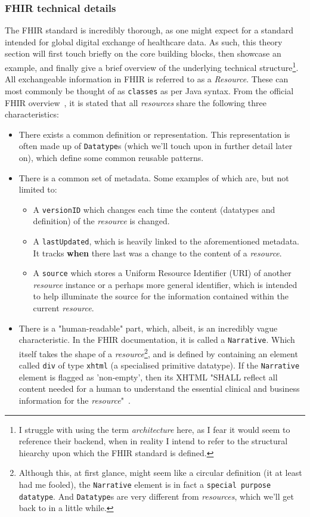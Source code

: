 \subsubsection*{FHIR technical details}
The FHIR standard is incredibly thorough, as one might expect for a standard intended for global digital exchange of healthcare data. As such, this theory section will first touch briefly on the core building blocks, then showcase an example, and finally give a brief overview of the underlying technical structure\footnote{I struggle with using the term \emph{architecture} here, as I fear it would seem to reference their backend, when in reality I intend to refer to the structural hiearchy upon which the FHIR standard is defined.}.
\\ 
All exchangeable information in FHIR is referred to as a \emph{Resource}. These can most commonly be thought of as \texttt{classes} as per Java syntax. From the official FHIR overview~\cite{FHIR-overview}, it is stated that all \emph{resources} share the following three characteristics:
\begin{itemize}
	\item There exists a common definition or representation. This representation is often made up of \texttt{Datatype}s (which we'll touch upon in further detail later on), which define some common reusable patterns.
	\item There is a common set of metadata. Some examples of which are, but not limited to:
	\begin{itemize}
		\item A \texttt{versionID} which changes each time the content (datatypes and definition) of the \emph{resource} is changed.
		\item  A \texttt{lastUpdated}, which is heavily linked to the aforementioned metadata. It tracks \textbf{when} there last was a change to the content of a \emph{resource}.
		\item A \texttt{source} which stores a Uniform Resource Identifier (URI) of another \emph{resource} instance or a perhaps more general identifier, which is intended to help illuminate the source for the information contained within the current \emph{resource}. 
	\end{itemize}
	\item There is a "human-readable" part, which, albeit, is an incredibly vague characteristic. In the FHIR documentation, it is called a \texttt{Narrative}. Which itself takes the shape of a \emph{resource}\footnote{Although this, at first glance, might seem like a circular definition (it at least had me fooled), the \texttt{Narrative} element is in fact a \texttt{special purpose datatype}. And \texttt{Datatype}s are very different from \emph{resources}, which we'll get back to in a little while.}, and is defined by containing an element called \texttt{div} of type \texttt{xhtml} (a specialised primitive datatype). If the \texttt{Narrative} element is flagged as 'non-empty', then its XHTML "SHALL reflect all content needed for a human to understand the essential clinical and business information for the \emph{resource}"~\cite{FHIR-Narrative}.
\end{itemize}
